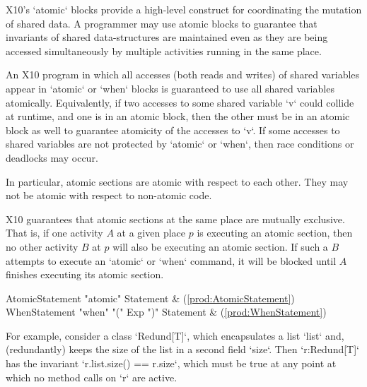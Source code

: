 X10's \xcd`atomic` blocks provide a high-level construct for coordinating
the mutation of shared data. 
A programmer may use atomic blocks to guarantee that invariants of
shared data-structures are maintained even as they are being accessed
simultaneously by multiple activities running in the same place.  

An X10 program in which all accesses (both reads and writes) of shared
variables appear in \xcd`atomic` or \xcd`when` blocks is guaranteed to use all
shared variables atomically.  Equivalently, 
if two accesses to some shared variable \xcd`v` could collide at runtime, and
one is in an atomic block, then the other must be in an atomic block as well
to guarantee atomicity of the accesses to \xcd`v`. 
If some accesses to shared variables are not
protected by \xcd`atomic` or \xcd`when`, then race conditions or deadlocks may
occur.  

In particular, atomic sections are atomic with respect to each other. They may
not be atomic with respect to non-atomic code.  

X10 guarantees that atomic sections at the same place are mutually exclusive.
That is, if one activity $A$ at a given place $p$ is executing an atomic
section, then no other activity $B$ at $p$ will also be executing an atomic
section. If such a $B$ attempts to execute an \xcd`atomic` or \xcd`when`
command, it will be blocked until $A$ finishes executing its atomic section.  



\begin{bbgrammar}
     AtomicStatement \: \xcd"atomic" Statement & (\ref{prod:AtomicStatement}) \\
       WhenStatement \: \xcd"when" \xcd"(" Exp \xcd")" Statement & (\ref{prod:WhenStatement}) \\
\end{bbgrammar}

For example, consider a class \xcd`Redund[T]`, which encapsulates a list
\xcd`list` and, (redundantly) keeps the size of the list in a second field
\xcd`size`.  Then \xcd`r:Redund[T]` has the invariant 
\xcd`r.list.size() == r.size`, which must be true at any point at which
no method calls on \xcd`r` are active.

